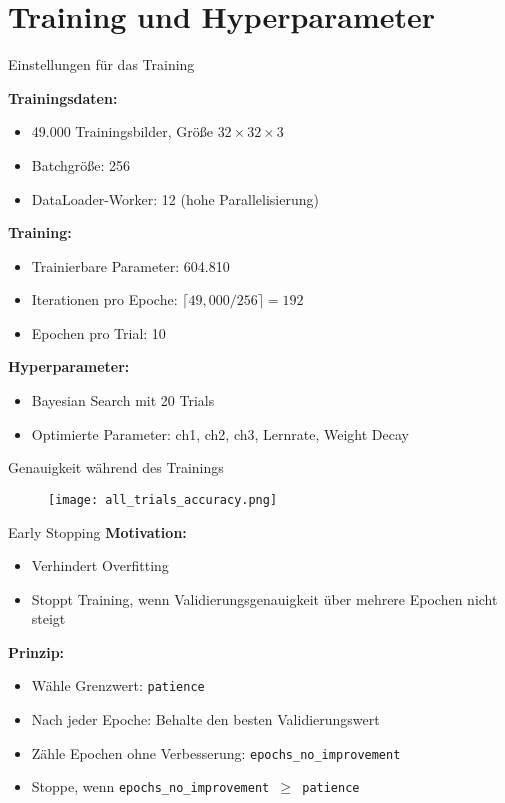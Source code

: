 \section{Training und Hyperparameter}

\begin{frame}{Einstellungen für das Training}

\textbf{Trainingsdaten:}
\begin{itemize}
    \item 49.000 Trainingsbilder, Größe $32 \times 32 \times 3$
    \item Batchgröße: 256
    \item DataLoader-Worker: 12 (hohe Parallelisierung)
\end{itemize}

\textbf{Training:}
\begin{itemize}
    \item Trainierbare Parameter: 604.810
    \item Iterationen pro Epoche: $\lceil 49{,}000 / 256 \rceil = 192$
    \item Epochen pro Trial: 10
\end{itemize}

\textbf{Hyperparameter:}
\begin{itemize}
    \item \alert{Bayesian Search} mit 20 Trials
    \item Optimierte Parameter: ch1, ch2, ch3, Lernrate, Weight Decay
\end{itemize}
\end{frame}

\begin{frame}{Genauigkeit während des Trainings}
\begin{figure}
    \centering
    \texttt{[image: all\_trials\_accuracy.png]}
\end{figure}
\end{frame}

\begin{frame}[fragile]{Early Stopping}
\textbf{Motivation:} 
\begin{itemize}
    \item Verhindert Overfitting
    \item Stoppt Training, wenn Validierungsgenauigkeit über mehrere Epochen nicht steigt
\end{itemize}

\textbf{Prinzip:}
\begin{itemize}
    \item Wähle Grenzwert: \texttt{patience}
    \item Nach  jeder Epoche: Behalte den besten Validierungswert
    \item Zähle Epochen ohne Verbesserung: \texttt{epochs\_no\_improvement}
    \item Stoppe, wenn \texttt{epochs\_no\_improvement $\ge$ patience}
\end{itemize}
\end{frame}

